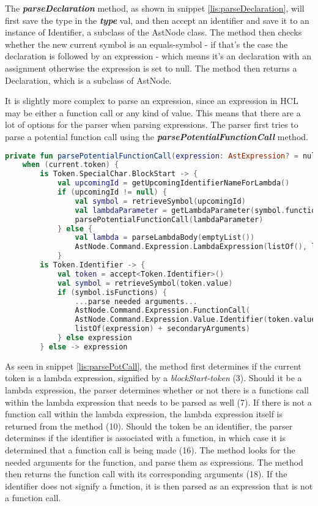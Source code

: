 The \textbf{\textit{parseDeclaration}} method, as shown in snippet \ref{lis:parseDeclaration}, will first save the type in the \textbf{\textit{type}} val, and then accept an identifier and save it to an instance of Identifier, a subclass of the AstNode class. 
The method then checks whether the new current symbol is an equals-symbol - if that's the case the declaration is followed by an expression - which means it's an declaration with an assignment otherwise the expression is set to null. 
The method then returns a Declaration, which is a subclass of AstNode.  

It is slightly more complex to parse an expression, since an expression in HCL may be either a function call or any kind of value.
This means that there are a lot of options for the parser when parsing expressions.
The parser first tries to parse a potential function call using the \textbf{\textit{parsePotentialFunctionCall}} method.

\begin{lstlisting}[language=Kotlin,label=lis:parsePotCall,caption=A simplified version of the parsePotentialFunctionCall method from the parser.]
private fun parsePotentialFunctionCall(expression: AstExpression? = null): AstExpression =
    when (current.token) {
        is Token.SpecialChar.BlockStart -> {
            val upcomingId = getUpcomingIdentifierNameForLambda()
            if (upcomingId != null) {
                val symbol = retrieveSymbol(upcomingId)
                val lambdaParameter = getLambdaParameter(symbol.functions, 0)
                parsePotentialFunctionCall(lambdaParameter)
            } else {
                val lambda = parseLambdaBody(emptyList())
                AstNode.Command.Expression.LambdaExpression(listOf(), lambda.type, lambda.lambdaBody)
            }
        is Token.Identifier -> {
            val token = accept<Token.Identifier>()
            val symbol = retrieveSymbol(token.value)
            if (symbol.isFunctions) {
        	    ...parse needed arguments...
        	    AstNode.Command.Expression.FunctionCall(
        	    AstNode.Command.Expression.Value.Identifier(token.value),
        	    listOf(expression) + secondaryArguments)
            } else expression
        } else -> expression
\end{lstlisting}

As seen in snippet \ref{lis:parsePotCall}, the method first determines if the current token is a lambda expression, signified by a \textit{blockStart-token} (3).
Should it be a lambda expression, the parser determines whether or not there is a functions call within the lambda expression that needs to be parsed as well (7).
If there is not a function call within the lambda expression, the lambda expression itself is returned from the method (10). 
Should the token be an identifier, the parser determines if the identifier is associated with a function, in which case it is determined that a function call is being made (16).
The method looks for the needed arguments for the function, and parse them as expressions.
The method then returns the function call with its corresponding arguments (18).
If the identifier does not signify a function, it is then parsed as an expression that is not a function call.

